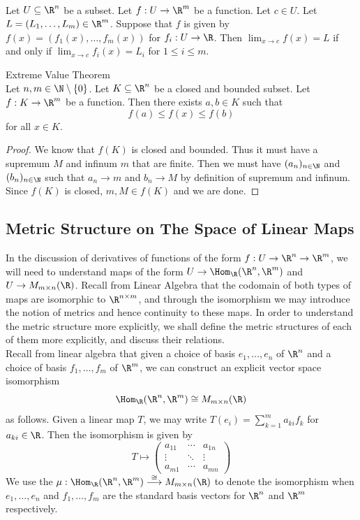 \documentclass[a4paper]{article}
\begin{document}
\begin{lmm}{}{}\\
Let $U\subseteq\R^n$ be a subset. Let $f:U\to\R^m$ be a function. Let $c\in U$. Let $L=(L_1,\dots,L_m)\in\R^m$. Suppose that $f$ is given by $f(x)=(f_1(x),\dots,f_m(x))$ for $f_i:U\to\R$. Then $\lim_{x\to c}f(x)=L$ if and only if $\lim_{x\to c}f_i(x)=L_i$ for $1\leq i\leq m$. 
\end{lmm}

\begin{thm}{Extreme Value Theorem}{}\\
Let $n,m\in\N\setminus\{0\}$. Let $K\subseteq\R^n$ be a closed and bounded subset. Let $f:K\to\R^m$ be a function. Then there exists $a,b\in K$ such that $$f(a)\leq f(x)\leq f(b)$$ for all $x\in K$. 
\begin{proof}
We know that $f(K)$ is closed and bounded. Thus it must have a supremum $M$ and infinum $m$ that are finite. Then we must have $(a_n)_{n\in\N}$ and $(b_n)_{n\in\N}$ such that $a_n\to m$ and $b_n\to M$ by definition of supremum and infinum. Since $f(K)$ is closed, $m,M\in f(K)$ and we are done. 
\end{proof}
\end{thm}

\subsection{Metric Structure on The Space of Linear Maps}
In the discussion of derivatives of functions of the form $f:U\to\R^n\to\R^m$, we will need to understand maps of the form $U\to\Hom_\R(\R^n,\R^m)$ and $U\to M_{m\times n}(\R)$. Recall from Linear Algebra that the codomain of both types of maps are isomorphic to $\R^{n\times m}$, and through the isomorphism we may introduce the notion of metrics and hence continuity to these maps. In order to understand the metric structure more explicitly, we shall define the metric structures of each of them more explicitly, and discuss their relations. \\

Recall from linear algebra that given a choice of basis $e_1,\dots,e_n$ of $\R^n$ and a choice of basis $f_1,\dots,f_m$ of $\R^m$, we can construct an explicit vector space isomorphism $$\Hom_\R(\R^n,\R^m)\cong M_{m\times n}(\R)$$ as follows. Given a linear map $T$, we may write $T(e_i)=\sum_{k=1}^ma_{ki}f_k$ for $a_{ki}\in\R$. Then the isomorphism is given by $$T\mapsto\begin{pmatrix}
a_{11} & \cdots & a_{1n}\\
\vdots & \ddots & \vdots\\
a_{m1} & \cdots & a_{mn}
\end{pmatrix}$$ We use the $\mu:\Hom_\R(\R^n,\R^m)\overset{\cong}{\longrightarrow}M_{m\times n}(\R)$ to denote the isomorphism when $e_1,\dots,e_n$ and $f_1,\dots,f_m$ are the standard basis vectors for $\R^n$ and $\R^m$ respectively. 
\end{document}
